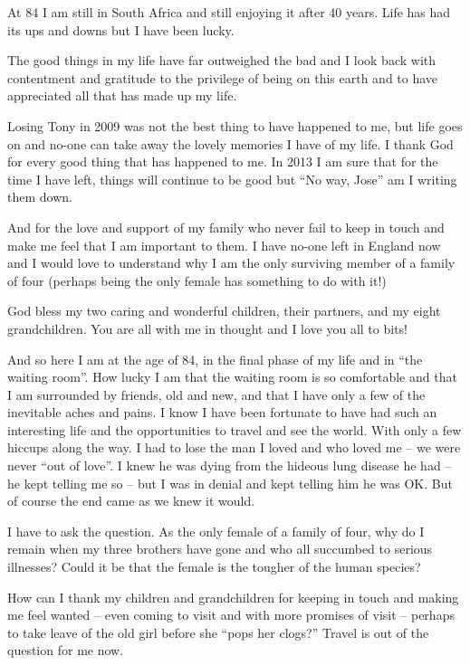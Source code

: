 At 84 I am still in South Africa and still enjoying it after 40
years. Life has had its ups and downs but I have been lucky.

The good things in my life have far outweighed the bad and I look back
with contentment and gratitude to the privilege of being on this earth
and to have appreciated all that has made up my life.

Losing Tony in 2009 was not the best thing to have happened to me, but
life goes on and no-one can take away the lovely memories I have of my
life. I thank God for every good thing that has happened to me. In
2013 I am sure that for the time I have left, things will continue to
be good but ``No way, Jose'' am I writing them down.

And for the love and support of my family who never fail to keep in
touch and make me feel that I am important to them. I have no-one left
in England now and I would love to understand why I am the only
surviving member of a family of four (perhaps being the only female
has something to do with it!)

God bless my two caring and wonderful children, their partners, and my
eight grandchildren. You are all with me in thought and I love you all
to bits!

And so here I am at the age of 84, in the final phase of my life and
in ``the waiting room''. How lucky I am that the waiting room is so
comfortable and that I am surrounded by friends, old and new, and that
I have only a few of the inevitable aches and pains. I know I have
been fortunate to have had such an interesting life and the
opportunities to travel and see the world. With only a few hiccups
along the way. I had to lose the man I loved and who loved me -- we
were never ``out of love''. I knew he was dying from the hideous lung
disease he had -- he kept telling me so -- but I was in denial and
kept telling him he was OK. But of course the end came as we knew it
would.

I have to ask the question. As the only female of a family of four,
why do I remain when my three brothers have gone and who all succumbed
to serious illnesses? Could it be that the female is the tougher of
the human species?

How can I thank my children and grandchildren for keeping in touch and
making me feel wanted -- even coming to visit and with more promises
of visit -- perhaps to take leave of the old girl before she ``pops
her clogs?'' Travel is out of the question for me now.

